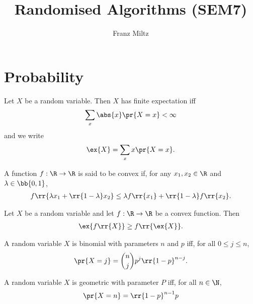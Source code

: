 \documentclass{article}
\title{Randomised Algorithms (SEM7)}
\author{Franz Miltz}
\begin{document}
\maketitle
\tableofcontents
\pagebreak

\section{Probability}

\begin{definition}
	\label{def:expectation}
	Let $X$ be a random variable. Then $X$ has finite expectation iff
	\begin{align*}
		\sum_{x} \abs{x} \pr{X=x} < \infty
	\end{align*}
	and we write
	\begin{align*}
		\ex{X} = \sum_{x} x \pr{X=x}.
	\end{align*}
\end{definition}

\begin{definition}
	\label{def:convex}
	A function $f:\R\to\R$ is said to be convex if, for any $x_1,x_2\in\R$
	and $\lambda\in\bb{0,1}$,
	\begin{align*}
		f\rr{\lambda x_1 + \rr{1-\lambda}x_2} \leq \lambda f\rr{x_1} + \rr{1-\lambda}f \rr{x_2}.
	\end{align*}
\end{definition}

\begin{theorem}
	\label{thm:jensens}
	Let $X$ be a random variable and let $f:\R\to\R$ be a convex function. Then
	\begin{align*}
		\ex{f\rr{X}} \geq f\rr{\ex{X}}.
	\end{align*}
\end{theorem}

\begin{definition}
	\label{def:binomial}
	A random variable $X$ is binomial with parameters $n$ and $p$ iff,
	for all $0\leq j\leq n$,
	\begin{align*}
		\pr{X=j}=\binom{n}{j}p^j \rr{1-p}^{n-j}.
	\end{align*}
\end{definition}

\begin{definition}
	\label{def:geometric}
	A random variable $X$ is geometric with parameter $P$ iff, for all $n\in\N$,
	\begin{align*}
		\pr{X=n}=\rr{1-p}^{n-1} p
	\end{align*}
\end{definition}
\end{document}
